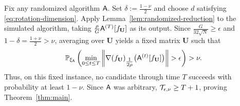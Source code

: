 Fix any randomized algorithm ${\mathsf{A}}$.
Set $\delta:=\tfrac{1-\nu}{2}$ and choose $d$ satisfying
\eqref{eq:rotation-dimension}.
Apply Lemma~\ref{lem:randomized-reduction} to the
simulated algorithm, taking
$\tfrac\rho G{\mathsf{A}}^{(T)}[f_{\mathbf U}]$ as its output. Since $\tfrac{G}{32\sqrt N}\ge\epsilon$ and $ 1-\delta=\tfrac{1+\nu}{2}>\nu$, 
averaging over $\mathbf U$ yields a fixed matrix
$\mathbf U$ such that
\[
 \mathbb P_{\xi_{\sA}}\left(
 \min_{0\le t\le T}
 \left\|
 \nabla(f_{\mathbf U})_{\tfrac1{2\rho}}
 \bigl(\sA^{(t)}[f_{\mathbf U}]\bigr)
 \right\|>\epsilon
 \right)>\nu.
\]
Thus, on this fixed instance, no candidate through
time $T$ succeeds with probability at least $1-\nu$.
Since ${\mathsf{A}}$ was arbitrary,
${\cal T}_{\epsilon,\nu}\ge T+1$, proving
Theorem~\ref{thm:main}.





